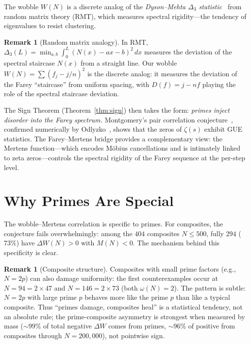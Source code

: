\documentclass[11pt]{article}
\theoremstyle{definition}
\newtheorem{remark}[theorem]{Remark}
\begin{document}
The wobble $W(N)$ is a discrete analog of the \emph{Dyson--Mehta
$\Delta_3$ statistic}~\cite{DysonMehta1963} from random matrix theory (RMT), which measures
spectral rigidity---the tendency of eigenvalues to resist clustering.

\begin{remark}[Random matrix analogy]\label{rem:rmt}
In RMT, $\Delta_3(L) = \min_{a,b} \int_0^L (N(x) - ax - b)^2\,dx$
measures the deviation of the spectral staircase $N(x)$ from a
straight line.  Our wobble $W(N) = \sum (f_j - j/n)^2$ is the
discrete analog: it measures the deviation of the Farey ``staircase''
from uniform spacing, with $D(f) = j - nf$ playing the role of the
spectral staircase deviation.

The Sign Theorem (Theorem~\ref{thm:sign}) then takes the form:
\emph{primes inject disorder into the Farey spectrum.}
Montgomery's pair correlation conjecture~\cite{Montgomery1973},
confirmed numerically by Odlyzko~\cite{Odlyzko1987}, shows that the zeros of
$\zeta(s)$ exhibit GUE statistics.
The Farey--Mertens bridge provides a complementary view: the
Mertens function---which encodes M\"obius cancellations and is
intimately linked to zeta zeros---controls the spectral rigidity
of the Farey sequence at the per-step level.
\end{remark}


\section{Why Primes Are Special}\label{sec:primes-special}

The wobble--Mertens correlation is specific to primes.  For
composites, the conjecture fails overwhelmingly: among the $404$
composites $N \le 500$, fully $294$ ($73\%$) have
$\Delta W(N) > 0$ with $M(N) < 0$.  The mechanism behind this
specificity is clear.

\begin{remark}[Composite structure]
Composites with small prime factors (e.g., $N = 2p$) can also
damage uniformity: the first counterexamples occur at $N = 94 = 2 \times 47$
and $N = 146 = 2 \times 73$ (both $\omega(N) = 2$).
The pattern is subtle: $N = 2p$ with large prime $p$ behaves more
like the prime $p$ than like a typical composite.
Thus ``primes damage, composites heal'' is a statistical
tendency, not an absolute rule; the prime-composite asymmetry is
strongest when measured by mass (${\sim}99\%$ of total negative
$\Delta W$ comes from primes, ${\sim}96\%$ of positive from composites
through $N = 200{,}000$), not pointwise sign.
\end{remark}
\end{document}
